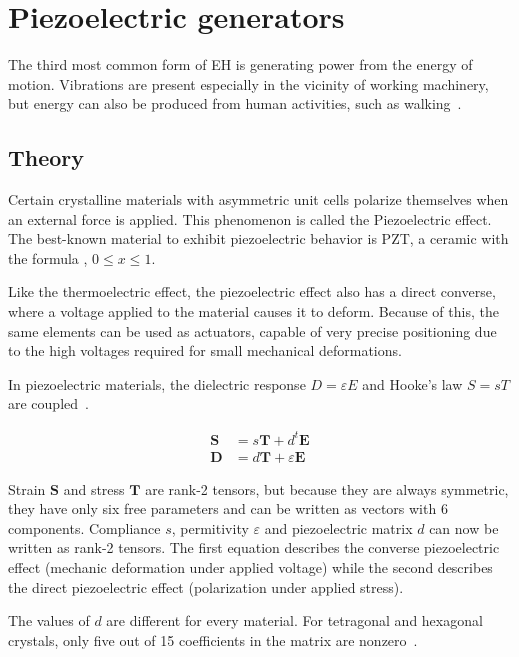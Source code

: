 \documentclass[a4paper,10pt]{article}
\renewcommand{\vec}{\mathbf}
\begin{document}
\section{Piezoelectric generators}

The third most common form of \ac{EH} is generating power from the energy of motion. Vibrations are present especially in the vicinity of working machinery, but energy can also be produced from human activities, such as walking~\cite{piezo-shoe-ieee}. 

\subsection{Theory}

Certain crystalline materials with asymmetric unit cells polarize themselves when an external force is applied. This phenomenon is called the Piezoelectric effect. The best-known material to exhibit piezoelectric behavior is \ac{PZT}, a ceramic with the formula , $0\leq x \leq 1$.


Like the thermoelectric effect, the piezoelectric effect also has a direct converse, where a voltage applied to the material causes it to deform. Because of this, the same elements can be used as actuators, capable of very precise positioning due to the high voltages required for small mechanical deformations. 

In piezoelectric materials, the dielectric response $D = \varepsilon E$ and Hooke's law $S = sT$ are coupled~\cite{wiki:piezo}. 

\begin{align}
 \vec S &= s \vec T + d^t \vec E \\
 \vec D &= d \vec T + \varepsilon \vec E
\end{align}

Strain $\vec S$ and stress $\vec T$ are rank-2 tensors, but because they are always symmetric, they have only six free parameters and can be written as vectors with 6 components. Compliance $s$, permitivity $\varepsilon$ and piezoelectric matrix $d$ can now be written as rank-2 tensors. The first equation describes the converse piezoelectric effect (mechanic deformation under applied voltage) while the second describes the direct piezoelectric effect (polarization under applied stress). 

The values of $d$ are different for every material. For tetragonal and hexagonal crystals, only five out of 15 coefficients in the matrix are nonzero~\cite{wiki:piezo}. 
\end{document}

